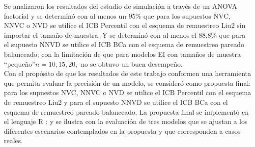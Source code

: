 Se analizaron los resultados del estudio de simulación a través de un ANOVA factorial y se determinó con al menos un 95\% que para los supuestos NVC, NNVC o NVD se utilice el ICB Percentil con el esquema de remuestreo Liu2 sin importar el tamaño de muestra. Y se determinó con al menos el 88.8\% que para el supuesto NNVD se utilice el ICB BCa con el esquema de remuestreo pareado balanceado; con la limitación de que para modelos EI con tamaños de muestra “pequeño”$ n=10, 15, 20,$ no se obtuvo un buen desempeño. \\


Con el propósito de que los resultados de este trabajo conformen una herramienta que permita evaluar la precisión de un modelo, se consideró como propuesta final: para los supuestos NVC, NNVC o NVD se utilice el ICB Percentil con el esquema de remuestreo Liu2 y para el supuesto NNVD se utilice el ICB BCa con el esquema de remuestreo pareado balanceado. La propuesta final se implementó en el lenguaje R \parencite{R-2024}; y se ilustra con la evaluación de tres modelos que se ajustan a los diferentes escenarios contemplados en la propuesta y que corresponden a casos reales.